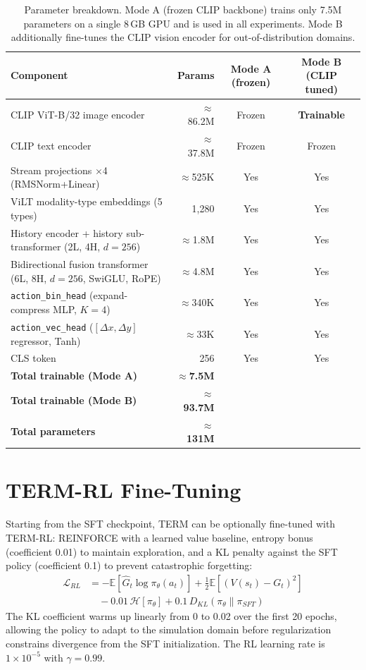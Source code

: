 \documentclass[letterpaper]{article} %
\begin{document}
\begin{table}[t]
\centering
\setlength{\tabcolsep}{4pt}
\small
\begin{tabular}{lrcc}
\toprule
\textbf{Component} & \textbf{Params} & \textbf{Mode A (frozen)} & \textbf{Mode B (CLIP tuned)} \\
\midrule
CLIP ViT-B/32 image encoder & ${\approx}$86.2M & Frozen & \textbf{Trainable} \\
CLIP text encoder & ${\approx}$37.8M & Frozen & Frozen \\
\midrule
Stream projections $\times$4 (RMSNorm+Linear) & ${\approx}$525K & Yes & Yes \\
ViLT modality-type embeddings (5 types) & 1,280 & Yes & Yes \\
History encoder + history sub-transformer (2L, 4H, $d{=}256$) & ${\approx}$1.8M & Yes & Yes \\
Bidirectional fusion transformer (6L, 8H, $d{=}256$, SwiGLU, RoPE) & ${\approx}$4.8M & Yes & Yes \\
\texttt{action\_bin\_head} (expand-compress MLP, $K{=}4$) & ${\approx}$340K & Yes & Yes \\
\texttt{action\_vec\_head} ($[\Delta x,\Delta y]$ regressor, Tanh) & ${\approx}$33K & Yes & Yes \\
CLS token & 256 & Yes & Yes \\
\midrule
\textbf{Total trainable (Mode A)} & ${\approx}$\textbf{7.5M} & & \\
\textbf{Total trainable (Mode B)} & ${\approx}$\textbf{93.7M} & & \\
\textbf{Total parameters} & ${\approx}$\textbf{131M} & & \\
\bottomrule
\end{tabular}
\caption{Parameter breakdown. Mode A (frozen CLIP backbone) trains only 7.5M parameters on a single 8\,GB GPU and is used in all experiments. Mode B additionally fine-tunes the CLIP vision encoder for out-of-distribution domains.}
\label{tab:params}
\end{table}

\section{TERM-RL Fine-Tuning}

Starting from the SFT checkpoint, TERM can be optionally fine-tuned with TERM-RL: REINFORCE \cite{williams1992reinforce} with a learned value baseline, entropy bonus (coefficient 0.01) to maintain exploration, and a KL penalty against the SFT policy (coefficient 0.1) to prevent catastrophic forgetting:
\begin{align}
\mathcal{L}_{RL} &= -\mathbb{E}[\hat{G}_t \log \pi_\theta(a_t)] + \tfrac{1}{2}\mathbb{E}[(V(s_t){-}G_t)^2] \nonumber\\
&\quad - 0.01\,\mathcal{H}[\pi_\theta] + 0.1\,D_{KL}(\pi_\theta \| \pi_{SFT})
\end{align}
The KL coefficient warms up linearly from 0 to 0.02 over the first 20 epochs, allowing the policy to adapt to the simulation domain before regularization constrains divergence from the SFT initialization. The RL learning rate is $1 \times 10^{-5}$ with $\gamma{=}0.99$.
\end{document}
